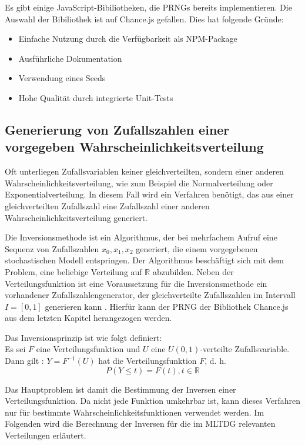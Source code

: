Es gibt einige JavaScript-Bibiliotheken, die \ac{PRNG}s bereits implementieren. Die Auswahl der Bibiliothek ist auf Chance.js gefallen. Dies hat folgende Gründe:
\begin{itemize}
    \item Einfache Nutzung durch die Verfügbarkeit als NPM-Package
    \item Ausführliche Dokumentation
    \item Verwendung eines Seeds
    \item Hohe Qualität durch integrierte Unit-Tests
\end{itemize}

\subsection{Generierung von Zufallszahlen einer vorgegeben Wahrscheinlichkeitsverteilung}

Oft unterliegen Zufallsvariablen keiner gleichverteilten, sondern einer anderen Wahrscheinlichkeitsverteilung, wie zum Beispiel die Normalverteilung oder Exponentialverteilung. In diesem Fall wird ein Verfahren benötigt, das aus einer gleichverteilten Zufallszahl eine Zufallszahl einer anderen Wahrscheinlichkeitsverteilung generiert.

Die Inversionsmethode ist ein Algorithmus, der bei mehrfachem Aufruf eine Sequenz von Zufallszahlen $x_0, x_1, x_2$ generiert, die einem vorgegebenen stochastischen Modell entspringen. Der Algorithmus beschäftigt sich mit dem Problem, eine beliebige Verteilung auf $\mathbb{R}$ abzubilden. Neben der Verteilungsfunktion ist eine Voraussetzung für die Inversionsmethode ein vorhandener Zufallszahlengenerator, der gleichverteilte Zufallszahlen im Intervall $I=[0,1]$ generieren kann \cite{Inversionsmethode}. Hierfür kann der \ac{PRNG} der Bibliothek Chance.js aus dem letzten Kapitel herangezogen werden.

Das Inversionsprinzip ist wie folgt definiert:\\
Es sei $F$ eine Verteilungsfunktion und $U$ eine $U(0,1)$-verteilte Zufallsvariable.\\
Dann gilt \cite{Inversionsmethode}: $Y = F^{-1}(U)$ hat die Verteilungsfunktion $F$, d. h.
$$P(Y \le t)=F(t),t \in \mathbb{R}$$

Das Hauptproblem ist damit die Bestimmung der Inversen einer Verteilungsfunktion. Da nicht jede Funktion umkehrbar ist, kann dieses Verfahren nur für bestimmte Wahrscheinlichkeitsfunktionen verwendet werden. Im Folgenden wird die Berechnung der Inversen für die im \ac{MLTDG} relevanten Verteilungen erläutert.

